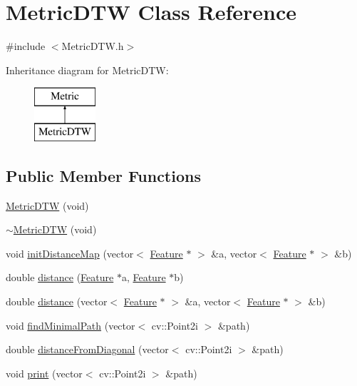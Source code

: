 \hypertarget{class_metric_d_t_w}{\section{Metric\+D\+T\+W Class Reference}
\label{class_metric_d_t_w}
}


{\ttfamily \#include $<$Metric\+D\+T\+W.\+h$>$}

Inheritance diagram for Metric\+D\+T\+W\+:\begin{figure}[H]
\begin{center}
\leavevmode
\includegraphics[height=2.000000cm]{class_metric_d_t_w}
\end{center}
\end{figure}
\subsection*{Public Member Functions}
\begin{DoxyCompactItemize}
\item 
\hyperlink{class_metric_d_t_w_af3d7712e07808d281e8884432db40cf0}{Metric\+D\+T\+W} (void)
\item 
\hyperlink{class_metric_d_t_w_a1a84f60596f8517bb360f362e82b277a}{$\sim$\+Metric\+D\+T\+W} (void)
\item 
void \hyperlink{class_metric_d_t_w_ae10fb8483b49695918429f3cb960a063}{init\+Distance\+Map} (vector$<$ \hyperlink{class_feature}{Feature} $\ast$ $>$ \&a, vector$<$ \hyperlink{class_feature}{Feature} $\ast$ $>$ \&b)
\item 
double \hyperlink{class_metric_d_t_w_a39e2011060167764d3c7e65e5072fbb5}{distance} (\hyperlink{class_feature}{Feature} $\ast$a, \hyperlink{class_feature}{Feature} $\ast$b)
\item 
double \hyperlink{class_metric_d_t_w_a7343dcb7bd4d654959e12bfb672622a2}{distance} (vector$<$ \hyperlink{class_feature}{Feature} $\ast$ $>$ \&a, vector$<$ \hyperlink{class_feature}{Feature} $\ast$ $>$ \&b)
\item 
void \hyperlink{class_metric_d_t_w_a37af163866e5922fccc8676ca236a6f2}{find\+Minimal\+Path} (vector$<$ cv\+::\+Point2i $>$ \&path)
\item 
double \hyperlink{class_metric_d_t_w_addd6e64c5742481e13bccf48daf62248}{distance\+From\+Diagonal} (vector$<$ cv\+::\+Point2i $>$ \&path)
\item 
void \hyperlink{class_metric_d_t_w_ac5a4922e152fad12a7e91ab5884b4e86}{print} (vector$<$ cv\+::\+Point2i $>$ \&path)
\end{DoxyCompactItemize}


